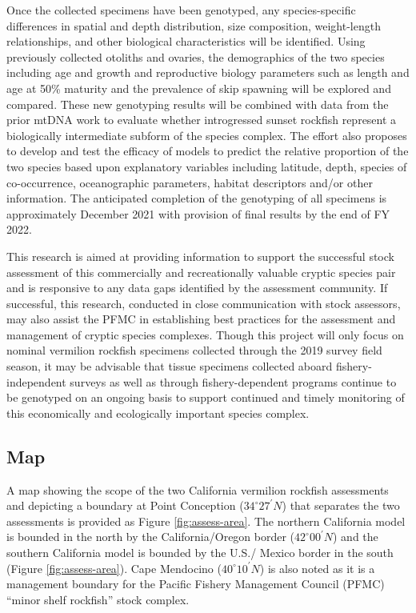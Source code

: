 \documentclass[
  english,
  a4paper,
]{article}
\begin{document}
Once the collected specimens have been genotyped, any species-specific differences
in spatial and depth distribution, size composition, weight-length relationships,
and other biological characteristics will be identified. Using previously
collected otoliths and ovaries, the demographics of the two species including
age and growth and reproductive biology parameters such as length and age at
50\% maturity and the prevalence of skip spawning will be explored and compared.
These new genotyping results will be combined with data from the prior mtDNA
work to evaluate whether introgressed sunset rockfish represent a biologically
intermediate subform of the species complex. The effort also proposes to develop
and test the efficacy of models to predict the relative proportion of the two
species based upon explanatory variables including latitude, depth, species of
co-occurrence, oceanographic parameters, habitat descriptors and/or other
information. The anticipated completion of the genotyping of all specimens
is approximately December 2021 with provision of final results by the end of FY 2022.

This research is aimed at providing information to support the successful stock
assessment of this commercially and recreationally valuable cryptic species pair
and is responsive to any data gaps identified by the assessment community. If
successful, this research, conducted in close communication with stock assessors,
may also assist the PFMC in establishing best practices for the assessment and
management of cryptic species complexes. Though this project will only focus
on nominal vermilion rockfish specimens collected through the 2019 survey
field season, it may be advisable that tissue specimens collected aboard
fishery-independent surveys as well as through fishery-dependent programs
continue to be genotyped on an ongoing basis to support continued and timely
monitoring of this economically and ecologically important species complex.

\hypertarget{map}{%
\subsection{Map}\label{map}}

A map showing the scope of the two California vermilion rockfish assessments and depicting a
boundary
at Point Conception ($34^\circ 27^\prime N$) that separates the two assessments is provided as Figure \ref{fig:assess-area}. The northern California
model is bounded in the north by the California/Oregon border ($42^\circ 00^\prime N$) and the southern California model is
bounded by the U.S./ Mexico border in the south (Figure \ref{fig:assess-area}).
Cape Mendocino ($40^\circ 10^\prime N$) is also noted as it is a management boundary for the
Pacific Fishery Management Council (PFMC) ``minor shelf rockfish'' stock complex.
\end{document}
